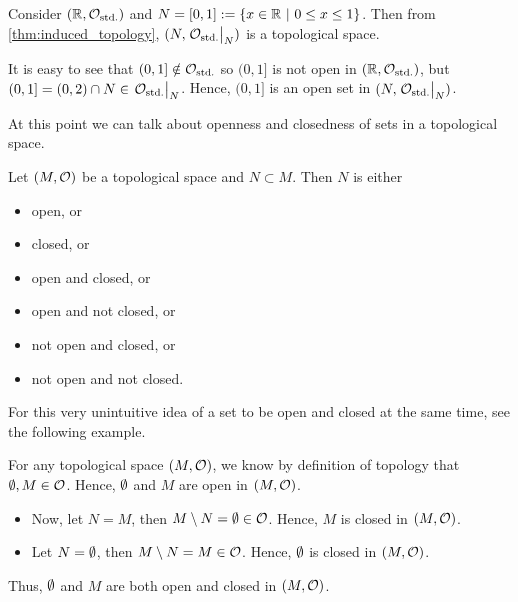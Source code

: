 \begin{example}
	Consider \((\mathbb R, \mathcal{O}_{\text{std.}})\) and \(N = \qty[0, 1] := \qty{x \in \mathbb R\ \middle|\ 0 \le x \le 1}\). Then from \cref{thm:induced_topology}, \((N, \eval{\COstd}_N)\) is a topological space.

	It is easy to see that \((0, 1] \notin \mathcal{O}_{\text{std.}}\) so \((0, 1]\) is not open in \((\mathbb R, \mathcal{O}_{\text{std.}})\), but \((0, 1] = (0, 2) \cap N \in \eval{\COstd}_N\). Hence, \((0, 1]\) is an open set in \((N, \eval{\COstd}_N)\).
\end{example}
At this point we can talk about openness and closedness of sets in a topological space.
\begin{remark}
	Let \((M, \mathcal{O})\) be a topological space and \(N \subset M\). Then \(N\) is either
	\begin{itemize}[noitemsep]
		\item open, or
		\item closed, or
		\item open and closed, or
		\item open and not closed, or
		\item not open and closed, or
		\item not open and not closed.
	\end{itemize}
\end{remark}
For this very unintuitive idea of a set to be open and closed at the same time, see the following example.
\begin{example}
	For any topological space \((M, \mathcal{O})\), we know by definition of topology that \(\emptyset, M \in \mathcal{O}\). Hence, \(\emptyset\) and \(M\) are open in \((M, \mathcal{O})\).
	\begin{itemize}
		\item Now, let \(N = M\), then \(M \setminus N = \emptyset \in \mathcal{O}\). Hence, \(M\) is closed in \((M, \mathcal{O})\).
		\item Let \(N = \emptyset\), then \(M \setminus N = M \in \mathcal{O}\). Hence, \(\emptyset\) is closed in \((M, \mathcal{O})\).
	\end{itemize}
	Thus, \(\emptyset\) and \(M\) are both open and closed in \((M, \mathcal{O})\).
\end{example}
